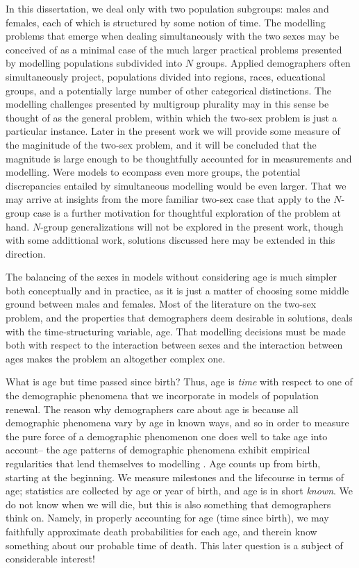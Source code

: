 In this dissertation, we deal only with two population subgroups: males and
females, each of which is structured by some notion of time. The modelling
problems that emerge when dealing simultaneously with the two sexes may be
conceived of as a minimal case of the much larger practical problems 
presented by modelling populations subdivided into $N$
groups. Applied demographers often simultaneously project,
populations divided into regions, races, educational groups, and a potentially
large number of other categorical distinctions. The modelling
challenges presented by multigroup plurality may in this sense be thought of as
the general problem, within which the two-sex problem is just a particular
instance. Later in the present work we will provide some measure of
the maginitude of the two-sex problem, and it will be concluded that the
magnitude is large enough to be thoughtfully accounted for in measurements and
modelling. Were models to ecompass even more groups, the potential discrepancies
entailed by simultaneous modelling would be even larger. That we may arrive at
insights from the more familiar two-sex case that apply to the $N$-group case is
a further motivation for thoughtful exploration of the problem at hand.
$N$-group generalizations will not be explored in the present work, though with
some addittional work, solutions discussed here may be extended in this
direction.

The balancing of the sexes in models without considering age is
much simpler both conceptually and in practice, as it is just a matter of
choosing some middle ground between males and females. Most of the literature on
the two-sex problem, and the properties that demographers deem desirable in
solutions, deals with the time-structuring variable, age. That modelling
decisions must be made both with respect to the interaction between sexes and
the interaction between ages makes the problem an altogether complex one. 

What is age but time passed since birth? Thus, age is \textit{time} with respect
to one of the demographic phenomena that we incorporate in models of population
renewal. The reason why demographers care about age is because all
demographic phenomena vary by age in known ways, and so in order to measure the
pure force of a demographic phenomenon one does well to take age into account-- the age patterns of
demographic phenomena exhibit empirical regularities that lend themselves to
modelling \citep{coale1996development}. Age counts 
up from birth, starting at the beginning. We measure milestones and the lifecourse in 
terms of age; statistics are collected by age or year of birth, and age is in 
short \textit{known}. We do not know when we will die, but
this is also something that demographers think on. Namely, in properly
accounting for age (time since birth), we may faithfully approximate death
probabilities for each age, and therein know something about our probable time
of death. This later question is a subject of considerable interest!

